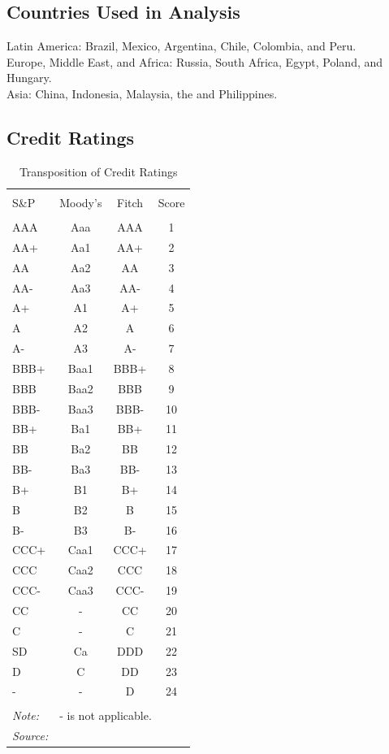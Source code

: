 \documentclass[12pt]{article}
\begin{document}
	\subsection{Countries Used in Analysis}
Latin America: Brazil, Mexico, Argentina, Chile, Colombia, and Peru.\\ Europe, Middle East, and Africa: Russia, South Africa, Egypt, Poland, and Hungary.\\
Asia: China, Indonesia, Malaysia, the and Philippines. 
	\subsection{Credit Ratings}
	\begin{table}[h!] \centering
	\caption{Transposition of Credit Ratings}
	\scriptsize
	\label{tbl6}
\begin{tabular}{@{\extracolsep{5pt}}lccc}
\\[-1.8ex]\hline \hline
\\[-1.8ex] S\&P & Moody's & Fitch & Score\\
\hline \\[-1.8ex]
AAA & Aaa & AAA & 1 \\
AA+ & Aa1 & AA+ & 2 \\
AA  & Aa2 & AA  & 3 \\
AA- & Aa3 & AA- & 4 \\
A+  & A1  & A+  & 5 \\
A   & A2  & A   & 6 \\
A-  & A3  & A-  & 7 \\
BBB+& Baa1& BBB+& 8 \\
BBB & Baa2& BBB & 9 \\
BBB-& Baa3& BBB-& 10\\
BB+ & Ba1 & BB+ & 11\\
BB  & Ba2 & BB  & 12\\
BB- & Ba3 & BB- & 13\\
B+  & B1  & B+  & 14\\
B   & B2  & B   & 15\\
B-  & B3  & B-  & 16\\
CCC+& Caa1& CCC+& 17\\
CCC & Caa2& CCC & 18\\
CCC-& Caa3& CCC-& 19\\
CC  & -   & CC  & 20\\
C   & -   & C   & 21\\
SD  & Ca  & DDD & 22\\
D   & C   & DD  & 23\\
-   & -   & D   & 24\\
\hline 
\hline \\[-1.8ex]
\textit{Note:}  & \multicolumn{3}{l}{- is not applicable.} \\
\textit{Source:} & \multicolumn{3}{l}{\textcite{bhatia02}} \\
\end{tabular}
\end{table}
\end{document}
